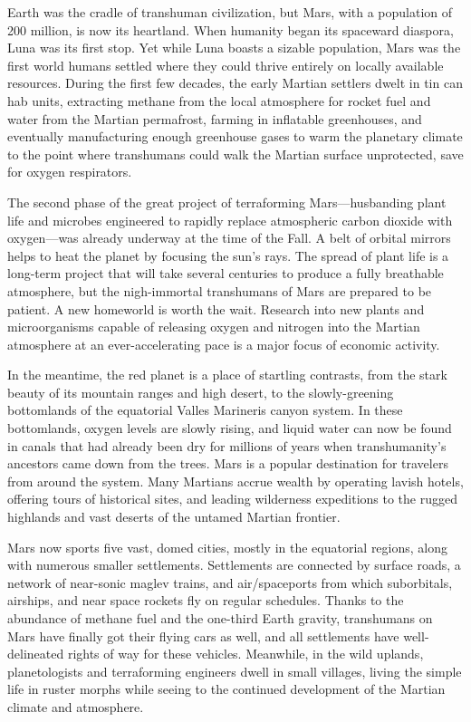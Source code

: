 Earth was the cradle of transhuman civilization, but Mars, with a
population of 200 million, is now its heartland. When humanity began
its spaceward diaspora, Luna was its first stop. Yet while Luna boasts
a sizable population, Mars was the first world humans settled where
they could thrive entirely on locally available resources. During the
first few decades, the early Martian settlers dwelt in tin can hab
units, extracting methane from the local atmosphere for rocket fuel
and water from the Martian permafrost, farming in inflatable
greenhouses, and eventually manufacturing enough greenhouse gases to
warm the planetary climate to the point where transhumans could walk
the Martian surface unprotected, save for oxygen respirators.

The second phase of the great project of terraforming Mars—husbanding
plant life and microbes engineered to rapidly replace atmospheric
carbon dioxide with oxygen—was already underway at the time of the
Fall. A belt of orbital mirrors helps to heat the planet by focusing
the sun's rays. The spread of plant life is a long-term project that
will take several centuries to produce a fully breathable atmosphere,
but the nigh-immortal transhumans of Mars are prepared to be
patient. A new homeworld is worth the wait.  Research into new plants
and microorganisms capable of releasing oxygen and nitrogen into the
Martian atmosphere at an ever-accelerating pace is a major focus of
economic activity.

In the meantime, the red planet is a place of startling contrasts,
from the stark beauty of its mountain ranges and high desert, to the
slowly-greening bottomlands of the equatorial Valles Marineris canyon
system. In these bottomlands, oxygen levels are slowly rising, and
liquid water can now be found in canals that had already been dry for
millions of years when transhumanity's ancestors came down from the
trees. Mars is a popular destination for travelers from around the
system. Many Martians accrue wealth by operating lavish hotels,
offering tours of historical sites, and leading wilderness expeditions
to the rugged highlands and vast deserts of the untamed Martian
frontier.

Mars now sports five vast, domed cities, mostly in the equatorial
regions, along with numerous smaller settlements. Settlements are
connected by surface roads, a network of near-sonic maglev trains, and
air/spaceports from which suborbitals, airships, and near space
rockets fly on regular schedules. Thanks to the abundance of methane
fuel and the one-third Earth gravity, transhumans on Mars have finally
got their flying cars as well, and all settlements have
well-delineated rights of way for these vehicles. Meanwhile, in the
wild uplands, planetologists and terraforming engineers dwell in small
villages, living the simple life in ruster morphs while seeing to the
continued development of the Martian climate and atmosphere.

